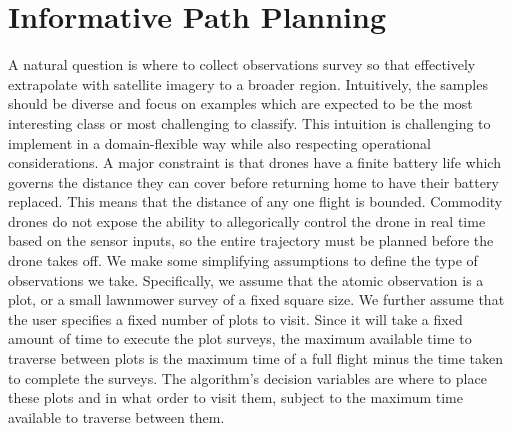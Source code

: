 %
%





\section{Informative Path Planning}
A natural question is where to collect observations survey so that effectively extrapolate with satellite imagery to a broader region. 
Intuitively, the samples should be diverse and focus on examples which are expected to be the most interesting class or most challenging to classify. This intuition is challenging to implement in a domain-flexible way while also respecting operational considerations.
A major constraint is that drones have a finite battery life which governs the distance they can cover before returning home to have their battery replaced. This means that the distance of any one flight is bounded. Commodity drones do not expose the ability to allegorically control the drone in real time based on the sensor inputs, so the entire trajectory must be planned before the drone takes off.
We make some simplifying assumptions to define the type of observations we take. Specifically, we assume that the atomic observation is a plot, or a small lawnmower survey of a fixed square size. We further assume that the user specifies a fixed number of plots to visit. Since it will take a fixed amount of time to execute the plot surveys, the maximum available time to traverse between plots is the maximum time of a full flight minus the time taken to complete the surveys. The algorithm's decision variables are where to place these plots and in what order to visit them, subject to the maximum time available to traverse between them.


